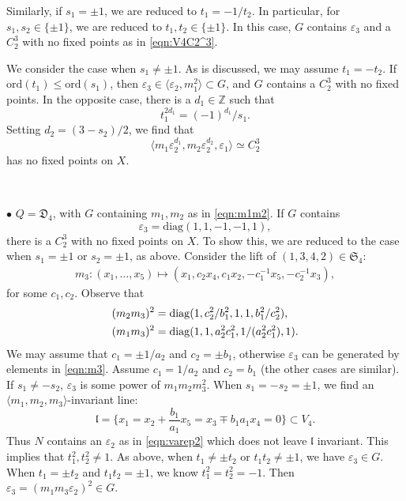 \documentclass[12pt,reqno]{amsart}
\theoremstyle{plain}
\theoremstyle{remark}
\theoremstyle{definition}
\numberwithin{equation}{section}
\def\fD{{\mathfrak D}}
\def\fS{{\mathfrak S}}
\def\fS{{\mathfrak S}}
\def\bZ{{\mathbb Z}}
\begin{document}
Similarly, if $s_1=\pm1$, we are reduced to $t_1=-1/t_2$. In particular, for 
$s_1,s_2\in\{\pm1\}$, we are reduced to $t_1,t_2\in\{\pm1\}$. In this case, $G$ contains $\varepsilon_3$ and a $C_2^3$ with no fixed points as in \eqref{eqn:V4C2^3}.

We consider the case when $s_1\ne \pm1$. As is discussed, we may assume $t_1=-t_2$.  
If $\mathrm{ord}(t_1)\le \mathrm{ord}(s_1)$, then $\varepsilon_3\in \langle \varepsilon_2, m_1^2\rangle\subset G$, and   
$G$ contains a $C_2^3$ with no fixed points. 
In the opposite case, there is a $d_1\in\bZ$ such that 
$$
t_1^{2d_1}=(-1)^{d_1}/s_1.
$$
Setting $d_2=(3-s_2)/2$, we find that 
$$
\langle  m_1\varepsilon_2^{d_1}, m_2\varepsilon_2^{d_2}, \varepsilon_1\rangle\simeq C_2^3
$$
has no fixed points on $X$.

\

$\bullet$  $Q=\fD_4$, with $G$ containing $m_1,m_2$ as in \eqref{eqn:m1m2}. 
If $G$ contains 
$$
\varepsilon_3=\mathrm{diag}(1,1,-1,-1,1),
$$
there is a $C_2^3$ with no fixed points on $X$.  To show this, 
we are reduced to the case when $s_1=\pm1$ or $s_2=\pm1$, as above.
Consider the lift  of $(1,3,4,2)\in\fS_4$:
\begin{align}\label{eqn:m3D4quadric}
m_3:(x_1,\ldots,x_5)\mapsto (x_1,c_2x_4,c_1x_2,-c_1^{-1}x_5,-c_2^{-1}x_3),
\end{align}
for some $c_1,c_2$. Observe that
\begin{align}\label{eqn:m3}
   (m_2m_3)^2&=\mathrm{diag}(1,c_2^2/b_1^2,1,1,b_1^2/c_2^2), \\
   (m_1m_3)^2&=\mathrm{diag}(1,1,a_2^2c_1^2,1/(a_2^2c_1^2),1).\notag
\end{align}
We may assume that $c_1=\pm 1/a_2$ and $c_2=\pm b_1$, otherwise $\varepsilon_3$ can be generated by elements in \eqref{eqn:m3}. Assume $c_1=1/a_2$ and $c_2=b_1$ (the other cases are similar). If $s_1\ne -s_2$, $\varepsilon_3$ is some power of $m_1m_2m_3^2$. When $s_1=-s_2=\pm 1$, we find an $\langle m_1,m_2,m_3\rangle$-invariant line:
$$
\mathfrak l=\{x_1=x_2+\frac{b_1}{a_1}x_5=x_3\mp b_1a_1x_4=0\} \subset V_4.
$$
Thus $N$ contains an $\varepsilon_2$ as in \eqref{eqn:varep2} which does not leave $\mathfrak l$ invariant. This implies that $t_1^2, t_2^2\ne1$. As above, when $t_1\ne\pm t_2$ or $t_1t_2\ne \pm1$, we have $\varepsilon_3\in G$. When $t_1=\pm t_2$ and $t_1t_2=\pm1$, we know $t_1^2=t_2^2=-1$. Then $
\varepsilon_3=(m_1m_3\varepsilon_2)^2\in G. %
$
\end{document}
